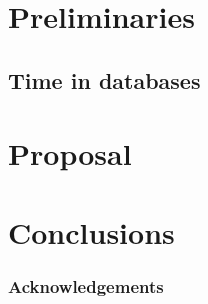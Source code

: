 \documentclass{llncs}
\begin{document}
%
\section{\label{sec:prel}Preliminaries}
%

%
%
%

%
\subsection{Time in databases}
%
%

%
\section{\label{sec:prop}Proposal}
%
%

%
\section{\label{sec:conc}Conclusions}
%
%
%
\subsubsection{Acknowledgements}
%






\end{document}
